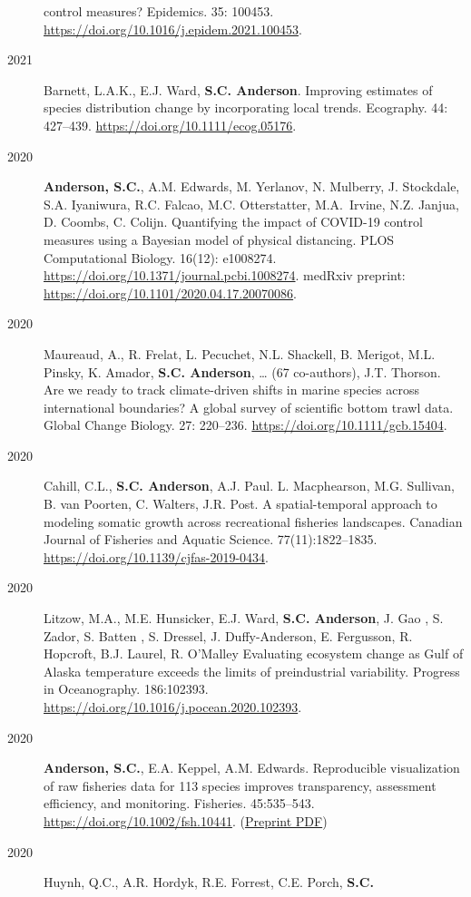 \begin{description}
control measures? Epidemics. 35: 100453.
\url{https://doi.org/10.1016/j.epidem.2021.100453}.
\item[2021]
Barnett, L.A.K., E.J. Ward, \textbf{S.C. Anderson}. Improving estimates
of species distribution change by incorporating local trends. Ecography.
44: 427--439. \url{https://doi.org/10.1111/ecog.05176}.
\item[2020]
\textbf{Anderson, S.C.}, A.M. Edwards, M. Yerlanov, N. Mulberry, J.
Stockdale, S.A. Iyaniwura, R.C. Falcao, M.C. Otterstatter, M.A.\ Irvine,
N.Z. Janjua, D. Coombs, C. Colijn. Quantifying the impact of COVID-19
control measures using a Bayesian model of physical distancing. PLOS
Computational Biology. 16(12): e1008274.
\url{https://doi.org/10.1371/journal.pcbi.1008274}. medRxiv preprint:
\url{https://doi.org/10.1101/2020.04.17.20070086}.
\item[2020]
Maureaud, A., R. Frelat, L. Pecuchet, N.L. Shackell, B. Merigot, M.L.
Pinsky, K. Amador, \textbf{S.C. Anderson}, \ldots{} (67 co-authors),
J.T. Thorson. Are we ready to track climate-driven shifts in marine
species across international boundaries? A global survey of scientific
bottom trawl data. Global Change Biology. 27: 220--236.
\url{https://doi.org/10.1111/gcb.15404}.
\item[2020]
Cahill, C.L., \textbf{S.C. Anderson}, A.J. Paul. L. Macphearson, M.G.
Sullivan, B. van Poorten, C. Walters, J.R. Post. A spatial-temporal
approach to modeling somatic growth across recreational fisheries
landscapes. Canadian Journal of Fisheries and Aquatic Science.
77(11):1822--1835. \url{https://doi.org/10.1139/cjfas-2019-0434}.
\item[2020]
Litzow, M.A., M.E. Hunsicker, E.J. Ward, \textbf{S.C. Anderson}, J. Gao
, S. Zador, S. Batten , S. Dressel, J. Duffy-Anderson, E. Fergusson, R.
Hopcroft, B.J. Laurel, R. O'Malley Evaluating ecosystem change as Gulf
of Alaska temperature exceeds the limits of preindustrial variability.
Progress in Oceanography. 186:102393.
\url{https://doi.org/10.1016/j.pocean.2020.102393}.
\item[2020]
\textbf{Anderson, S.C.}, E.A. Keppel, A.M. Edwards. Reproducible
visualization of raw fisheries data for 113 species improves
transparency, assessment efficiency, and monitoring. Fisheries.
45:535--543. \url{https://doi.org/10.1002/fsh.10441}.
(\href{https://www.dropbox.com/s/4mmnomvmpg0dbky/Anderson_etal_2020_reproducible_visualization_preprint.pdf?dl=1}{Preprint
PDF})
\item[2020]
Huynh, Q.C., A.R. Hordyk, R.E. Forrest, C.E. Porch, \textbf{S.C.
}
\end{description}
